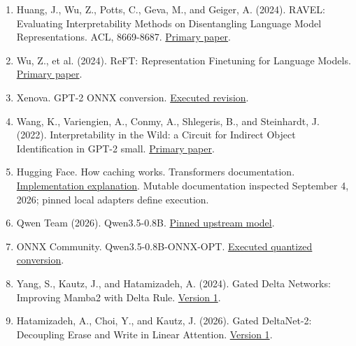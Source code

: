 \documentclass[11pt,letterpaper]{article}
\begin{document}
\begin{enumerate}[label=\arabic*.,itemsep=0.35em]
\item\label{ref:17}\begingroup{} Huang, J., Wu, Z., Potts, C., Geva, M., and Geiger, A. (2024). RAVEL: Evaluating Interpretability Methods on Disentangling Language Model Representations. ACL, 8669-8687. \href{https://aclanthology.org/2024.acl-long.470/}{Primary paper}.\par\endgroup
\item\label{ref:18}\begingroup{} Wu, Z., et al. (2024). ReFT: Representation Finetuning for Language Models. \href{https://arxiv.org/abs/2404.03592}{Primary paper}.\par\endgroup
\item\label{ref:19}\begingroup{} Xenova. GPT-2 ONNX conversion. \href{https://huggingface.co/Xenova/gpt2/tree/bf2c7f02e0b826c60d03af341171bde20893da66}{Executed revision}.\par\endgroup
\item\label{ref:20}\begingroup{} Wang, K., Variengien, A., Conmy, A., Shlegeris, B., and Steinhardt, J. (2022). Interpretability in the Wild: a Circuit for Indirect Object Identification in GPT-2 small. \href{https://arxiv.org/abs/2211.00593}{Primary paper}.\par\endgroup
\item\label{ref:21}\begingroup{} Hugging Face. How caching works. Transformers documentation. \href{https://huggingface.co/docs/transformers/main/en/cache_explanation}{Implementation explanation}. Mutable documentation inspected September 4, 2026; pinned local adapters define execution.\par\endgroup
\item\label{ref:22}\begingroup{} Qwen Team (2026). Qwen3.5-0.8B. \href{https://huggingface.co/Qwen/Qwen3.5-0.8B/tree/2fc06364715b967f1860aea9cf38778875588b17}{Pinned upstream model}.\par\endgroup
\item\label{ref:23}\begingroup{} ONNX Community. Qwen3.5-0.8B-ONNX-OPT. \href{https://huggingface.co/onnx-community/Qwen3.5-0.8B-ONNX-OPT/tree/fafab72d87a9e6be3925b38caf48286d2838f2d0}{Executed quantized conversion}.\par\endgroup
\item\label{ref:24}\begingroup{} Yang, S., Kautz, J., and Hatamizadeh, A. (2024). Gated Delta Networks: Improving Mamba2 with Delta Rule. \href{https://arxiv.org/html/2412.06464v1}{Version 1}.\par\endgroup
\item\label{ref:25}\begingroup{} Hatamizadeh, A., Choi, Y., and Kautz, J. (2026). Gated DeltaNet-2: Decoupling Erase and Write in Linear Attention. \href{https://arxiv.org/html/2605.22791v1}{Version 1}.\par\endgroup

\end{enumerate}
\end{document}
